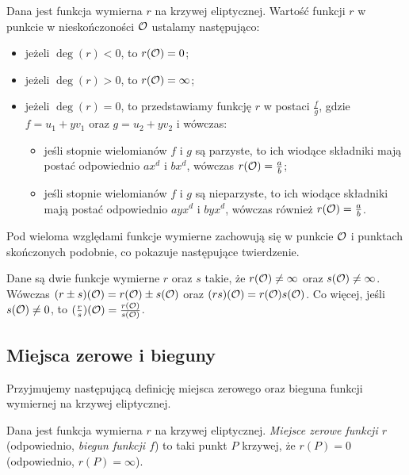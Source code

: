 \begin{definition}
Dana jest funkcja wymierna $r$ na krzywej eliptycznej.
Wartość funkcji $r$ w punkcie w nieskończoności $\mathcal{O}$
ustalamy następująco:
\begin{itemize}
\item jeżeli $\deg(r) < 0$, to $r(\mathcal{O}) = 0$;
\item jeżeli $\deg(r) > 0$, to $r(\mathcal{O}) = \infty$;
\item jeżeli $\deg(r) = 0$,
to przedstawiamy funkcję $r$ w postaci $\frac{f}{g}$,
gdzie $f = u_1 + yv_1$ oraz $g = u_2 + yv_2$
i wówczas:
\begin{itemize}
\item jeśli stopnie wielomianów $f$ i $g$ są parzyste,
to ich wiodące składniki mają postać odpowiednio $ax^d$ i $bx^d$,
wówczas $r(\mathcal{O}) = \frac{a}{b}$;
\item jeśli stopnie wielomianów $f$ i $g$ są nieparzyste,
to ich wiodące składniki mają postać odpowiednio $ayx^d$ i $byx^d$,
wówczas również $r(\mathcal{O}) = \frac{a}{b}$.
\end{itemize}
\end{itemize}
\end{definition}

Pod wieloma względami funkcje wymierne zachowują się
w punkcie $\mathcal{O}$ i punktach skończonych podobnie,
co pokazuje następujące twierdzenie.

\begin{theorem}
Dane są dwie funkcje wymierne $r$ oraz $s$ takie,
że $r(\mathcal{O}) \neq \infty$ oraz $s(\mathcal{O}) \neq \infty$.
Wówczas $(r \pm s)(\mathcal{O}) = r(\mathcal{O}) \pm s(\mathcal{O})$
oraz $(rs)(\mathcal{O}) = r(\mathcal{O})s(\mathcal{O})$.
Co więcej, jeśli $s(\mathcal{O}) \neq 0$,
to $(\frac{r}{s})(\mathcal{O}) = \frac{r(\mathcal{O})}{s(\mathcal{O})}$.
\end{theorem}

\subsection*{Miejsca zerowe i bieguny}

Przyjmujemy następującą definicję
miejsca zerowego oraz bieguna funkcji wymiernej na krzywej eliptycznej.

\begin{definition}
Dana jest funkcja wymierna $r$ na krzywej eliptycznej.
\emph{Miejsce zerowe funkcji $r$} (odpowiednio, \emph{biegun funkcji $f$})
to taki punkt $P$ krzywej, że $r(P) = 0$ (odpowiednio, $r(P) = \infty$).
\end{definition}

